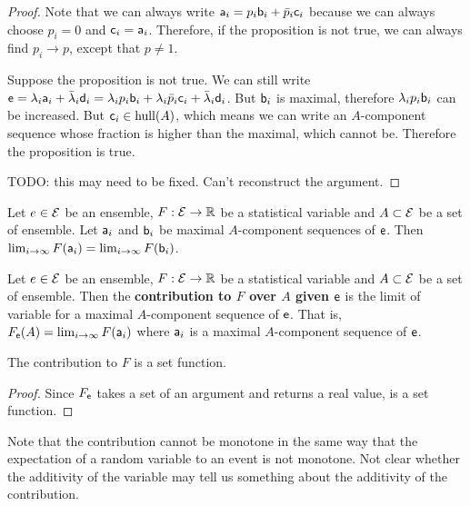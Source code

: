 \begin{proof}
	Note that we can always write $\ens[a]_i = p_i \ens[b]_i + \bar{p}_i \ens[c]_i$ because we can always choose $p_i = 0$ and $\ens[c]_i = \ens[a]_i$. Therefore, if the proposition is not true, we can always find $p_i \to p$, except that $p \neq 1$.
	
	Suppose the proposition is not true. We can still write $\ens = \lambda_i \ens[a]_i + \bar{\lambda}_i \ens[d]_i = \lambda_i p_i \ens[b]_i + \lambda_i \bar{p}_i \ens[c]_i + \bar{\lambda}_i \ens[d]_i$. But $\ens[b]_i$ is maximal, therefore $\lambda_i p_i \ens[b]_i$ can be increased. But $\ens[c]_i \in \hull(A)$, which means we can write an $A$-component sequence whose fraction is higher than the maximal, which cannot be. Therefore the proposition is true.
	
	TODO: this may need to be fixed. Can't reconstruct the argument.
\end{proof}

\begin{conj}
	Let $e \in \Ens$ be an ensemble, $F : \Ens \to \mathbb{R}$ be a statistical variable and $A \subset \Ens$ be a set of ensemble. Let $\ens[a]_i$ and $\ens[b]_i$ be maximal $A$-component sequences of $\ens$. Then $\lim_{i \to \infty} F(\ens[a]_i) = \lim_{i \to \infty} F(\ens[b]_i)$.
\end{conj}

\begin{defn}
	Let $e \in \Ens$ be an ensemble, $F : \Ens \to \mathbb{R}$ be a statistical variable and $A \subset \Ens$ be a set of ensemble. Then the \textbf{contribution to $F$ over $A$ given $\ens$} is the limit of variable for a maximal $A$-component sequence of $\ens$. That is, $F_{\ens}(A) = \lim_{i \to \infty} F(\ens[a]_i)$ where $\ens[a]_i$ is a maximal $A$-component sequence of $\ens$.
\end{defn}

\begin{prop}
	The contribution to $F$ is a set function.
\end{prop}

\begin{proof}
	Since $F_{\ens}$ takes a set of an argument and returns a real value, is a set function.
\end{proof}

\begin{remark}
	Note that the contribution cannot be monotone in the same way that the expectation of a random variable to an event is not monotone. Not clear whether the additivity of the variable may tell us something about the additivity of the contribution.
\end{remark}

